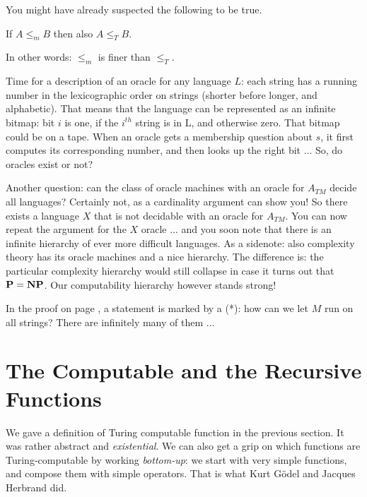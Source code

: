 You might have already suspected the following to be true.
\begin{theorem}
If $A \leq_m B$ then also $A \leq_T B$.

In other words: $\leq_m$ is finer than $\leq_T$.
\end{theorem}

Time for a description of an oracle for any language $L$: each
string has a running number in the lexicographic order on strings
(shorter before longer, and alphabetic). That means that the language
can be represented as an infinite bitmap: bit $i$ is one, if the
$i^{th}$ string is in L, and otherwise zero. That bitmap could be on a
tape. When an oracle gets a membership question about $s$, it first
computes its corresponding number, and then looks up the right bit
... So, do oracles exist or not?

Another question: can the class of oracle machines with an oracle for
$A_{TM}$ decide all languages? Certainly not, as a cardinality
argument can show you! So there exists a language $X$ that is not
decidable with an oracle for $A_{TM}$. You can now repeat the argument
for the $X$ oracle ... and you soon note that there is an infinite
hierarchy of ever more difficult languages. As a sidenote: also
complexity theory has its oracle machines and a nice hierarchy. The
difference is: the particular complexity hierarchy would still
collapse in case it turns out that ${\bf P} = {\bf NP}$. Our computability
hierarchy however stands strong!

\begin{exercise}
In the proof on page \pageref{allestrings},
a statement is marked by a (*): how can we let $M$ run on all strings?
There are infinitely many of them ...
\end{exercise}


\section{The Computable and the Recursive Functions}

We gave a definition of Turing computable function in the previous
section. It was rather abstract and {\em existential}. We can also
get a grip on which functions are Turing-computable by
working {\em bottom-up}: we start with very simple functions, and
compose them with simple operators. That is what Kurt Gödel and
Jacques Herbrand did.

